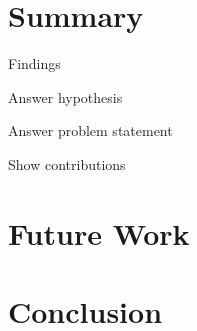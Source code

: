 \section{Summary}

Findings

Answer hypothesis

Answer problem statement

Show contributions


\section{Future Work}


\section{Conclusion}